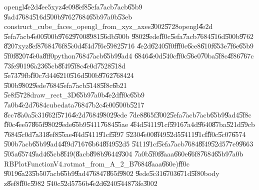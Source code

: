 opengl\U{4e2d}\U{4ee5}xyz\U{4e09}\U{8ef8}\U{5efa}\U{7acb}\U{7acb}\U{65b9}%
\U{9ad4}\U{7684}\U{516d}\U{500b}\U{9762}\U{7684}\U{65b9}\U{7a0b}\U{53eb}%
construct\_cube\_faces\_opengl\_from\_xyz\_axes\U{3002}\U{5728}opengl\U{4e2d}%
\U{5efa}\U{7acb}\U{4e00}\U{500b}\U{9762}\U{9700}\U{8981}\U{56db}\U{500b}%
\U{9802}\U{9ede}\U{ff0c}\U{5efa}\U{7acb}\U{7684}\U{516d}\U{500b}\U{9762}%
\U{8207}xyz\U{8ef8}\U{7684}\U{76f8}\U{5c0d}\U{4f4d}\U{7f6e}\U{5982}\U{5716}%
\U{4e2d}\U{6240}\U{5f0f}\U{ff0c}\U{6ce8}\U{610f}\U{653e}\U{7f6e}\U{65b9}%
\U{5f0f}\U{8207}\U{4e0a}\U{8ff0}python\U{7684}\U{7acb}\U{65b9}\U{9ad4}%
\U{6846}\U{4e0d}\U{540c}\U{ff0c}\U{56e0}\U{70ba}\U{5f8c}\U{4f86}\U{767c}%
\U{73fe}\U{9019}\U{6a23}\U{65cb}\U{8f49}\U{5f8c}\U{4e0d}\U{7528}\U{518d}%
\U{5e73}\U{79fb}\U{ff0c}\U{7d44}\U{6210}\U{516d}\U{500b}\U{9762}\U{7684}24%
\U{500b}\U{9802}\U{9ede}\U{7684}\U{5efa}\U{7acb}\U{5148}\U{5f8c}\U{6b21}%
\U{5e8f}\U{5728}draw\_rect\_3D\U{65b9}\U{7a0b}\U{4e2d}\U{ff0c}\U{65b9}%
\U{7a0b}\U{4e2d}\U{7684}cubedata\U{7684}\U{7b2c}\U{4e00}\U{500b}\U{5217}%
\U{8cc7}\U{8a0a}\U{5c31}\U{662f}\U{5716}\U{4e2d}\U{7684}\U{9802}\U{9ede}%
\U{7de8}\U{865f}\U{3002}\U{5efa}\U{7acb}\U{7acb}\U{65b9}\U{9ad4}\U{5f8c}%
\U{ff0c}\U{4ee5}7\U{865f}\U{9802}\U{9ede}\U{65b9}\U{5411}\U{7684}\U{55ae}%
\U{4f4d}\U{5411}\U{91cf}\U{5916}\U{7a4d}\U{9640}\U{87ba}\U{521d}\U{59cb}%
\U{7684}\U{5c0d}\U{7a31}\U{8ef8}\U{55ae}\U{4f4d}\U{5411}\U{91cf}\U{5f97}%
\U{5230}\U{4e00}\U{8f49}\U{52d5}\U{5411}\U{91cf}\U{ff0c}\U{5c07}\U{6574}%
\U{500b}\U{7acb}\U{65b9}\U{9ad4}\U{4f9d}\U{7167}\U{6b64}\U{8f49}\U{52d5}%
\U{5411}\U{91cf}\U{5efa}\U{7acb}\U{7684}\U{8f49}\U{52d5}\U{77e9}\U{9663}%
\U{505a}\U{6574}\U{9ad4}\U{65cb}\U{8f49}(\U{8acb}\U{898b}\U{9644}\U{9304}%
\U{7a0b}\U{5f0f}\U{8aaa}\U{660e}\U{66f8}\U{7684}\U{65b9}\U{7a0b}%
RBPlotFunctionV4.rotmat\_from\_A\_2\_B\U{7684}\U{8aaa}\U{660e})\U{ff0c}%
\U{9019}\U{6a23}\U{5b50}\U{7acb}\U{65b9}\U{9ad4}\U{7684}7\U{865f}\U{9802}%
\U{9ede}\U{5c31}\U{6703}\U{671d}\U{5f80}body z\U{8ef8}\U{ff0c}\U{5982}%
\U{540c}\U{52d5}\U{756b}\U{4e2d}\U{6240}\U{5448}\U{73fe}\U{3002}

%
